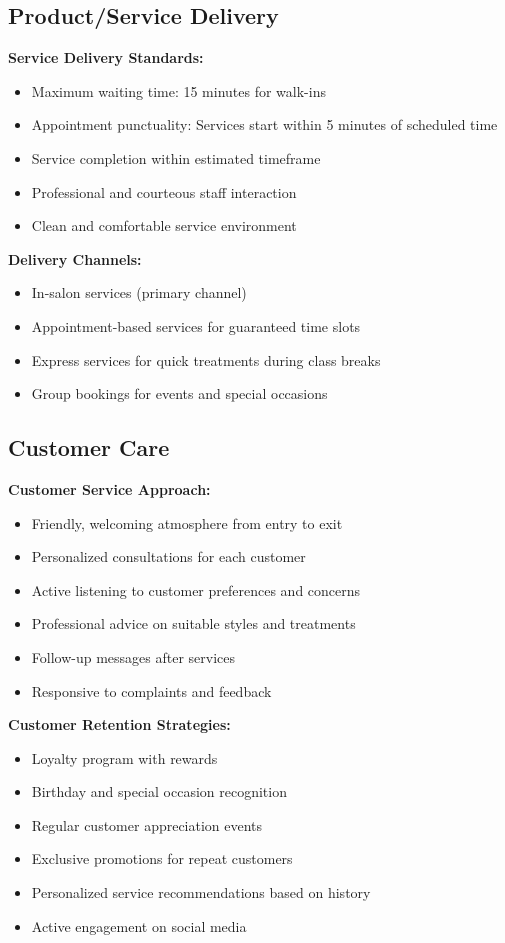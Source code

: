 \documentclass[a4paper,12pt]{article}
\begin{document}
\subsection{Product/Service Delivery}

\textbf{Service Delivery Standards:}
\begin{itemize}[leftmargin=2em]
    \item Maximum waiting time: 15 minutes for walk-ins
    \item Appointment punctuality: Services start within 5 minutes of scheduled time
    \item Service completion within estimated timeframe
    \item Professional and courteous staff interaction
    \item Clean and comfortable service environment
\end{itemize}

\textbf{Delivery Channels:}
\begin{itemize}[leftmargin=2em]
    \item In-salon services (primary channel)
    \item Appointment-based services for guaranteed time slots
    \item Express services for quick treatments during class breaks
    \item Group bookings for events and special occasions
\end{itemize}

\subsection{Customer Care}

\textbf{Customer Service Approach:}
\begin{itemize}[leftmargin=2em]
    \item Friendly, welcoming atmosphere from entry to exit
    \item Personalized consultations for each customer
    \item Active listening to customer preferences and concerns
    \item Professional advice on suitable styles and treatments
    \item Follow-up messages after services
    \item Responsive to complaints and feedback
\end{itemize}

\textbf{Customer Retention Strategies:}
\begin{itemize}[leftmargin=2em]
    \item Loyalty program with rewards
    \item Birthday and special occasion recognition
    \item Regular customer appreciation events
    \item Exclusive promotions for repeat customers
    \item Personalized service recommendations based on history
    \item Active engagement on social media
\end{itemize}
\end{document}
